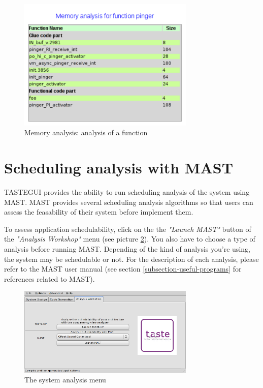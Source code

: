 \documentclass[11pt]{book}
\begin{document}
\begin{figure}[!h]
\centering
\includegraphics[width=0.75\textwidth]{imgs/memory-analysis5}
\caption{Memory analysis: analysis of a function}
\label{tastegui-mem-analysis-function}
\end{figure}


   \section{Scheduling analysis with MAST}
   TASTEGUI provides the ability to run scheduling analysis of the system
   using MAST. MAST provides several scheduling analysis algorithms so that
   users can assess the feasability of their system before implement them.

   To assess application schedulability, click on the the \textit{"Launch MAST"}
   button of the \textit{"Analysis Workshop"} menu (see picture
   \ref{tastegui-mast-menu}). You also have to choose a type of analysis before
   running MAST. Depending of the kind of analysis you're using, the system may
   be schedulable or not. For the description of each analysis, please refer to
   the MAST user manual (see section \ref{subsection-useful-programs} for
   references related to MAST).

\begin{figure}[!h]
\centering
\includegraphics[width=0.75\textwidth]{imgs/tastegui-mast-menu}
\caption{The system analysis menu}
\label{tastegui-mast-menu}
\end{figure}
\end{document}
